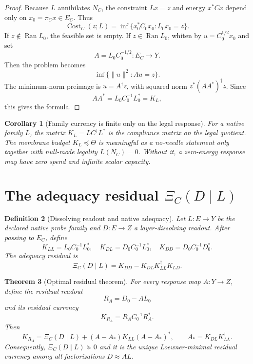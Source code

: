 \documentclass[11pt]{article}
\newtheorem{theorem}{Theorem}[section]
\newtheorem{definition}[theorem]{Definition}
\newtheorem{corollary}[theorem]{Corollary}
\DeclareMathOperator{\Ran}{Ran}
\DeclareMathOperator{\Cost}{Cost}
\begin{document}
\begin{proof}
Because \(L\) annihilates \(N_C\), the constraint \(Lx=z\) and energy \(x^*Cx\) depend only on \(x_0=\pi_Cx\in E_C\).  Thus
\[
  \Cost_C(z;L)=\inf\{x_0^*C_0x_0:L_0x_0=z\}.
\]
If \(z\notin\Ran L_0\), the feasible set is empty.  If \(z\in\Ran L_0\), whiten by \(u=C_0^{1/2}x_0\) and set
\[
  A=L_0C_0^{-1/2}:E_C\to Y.
\]
Then the problem becomes
\[
  \inf\{\|u\|^2:Au=z\}.
\]
The minimum-norm preimage is \(u=A^\dagger z\), with squared norm \(z^*(AA^*)^\dagger z\).  Since
\[
  AA^*=L_0C_0^{-1}L_0^*=K_L,
\]
this gives the formula.
\end{proof}

\begin{corollary}[Family currency is finite only on the legal response]
For a native family \(L\), the matrix \(K_L=LC^\dagger L^*\) is the compliance matrix on the legal quotient.  The membrane budget \(K_L\preceq\Theta\) is meaningful as a no-needle statement only together with null-mode legality \(L(N_C)=0\).  Without it, a zero-energy response may have zero spend and infinite scalar capacity.
\end{corollary}

\section{The adequacy residual \texorpdfstring{$\Xi_C(D\mid L)$}{Xi}}

\begin{definition}[Dissolving readout and native adequacy]
Let \(L:E\to Y\) be the declared native probe family and \(D:E\to Z\) a layer-dissolving readout.  After passing to \(E_C\), define
\[
  K_{LL}=L_0C_0^{-1}L_0^*,\quad
  K_{DL}=D_0C_0^{-1}L_0^*,\quad
  K_{DD}=D_0C_0^{-1}D_0^*.
\]
The \emph{adequacy residual} is
\[
  \boxed{\Xi_C(D\mid L)=K_{DD}-K_{DL}K_{LL}^\dagger K_{LD}.}
\]
\end{definition}

\begin{theorem}[Optimal residual theorem]
For every response map \(A:Y\to Z\), define the residual readout
\[
  R_A=D_0-AL_0
\]
and its residual currency
\[
  K_{R_A}=R_AC_0^{-1}R_A^*.
\]
Then
\[
  K_{R_A}
  =\Xi_C(D\mid L)+(A-A_*)K_{LL}(A-A_*)^*,
  \qquad
  A_*=K_{DL}K_{LL}^\dagger.
\]
Consequently, \(\Xi_C(D\mid L)\succeq0\) and it is the unique Loewner-minimal residual currency among all factorizations \(D\approx AL\).
\end{theorem}
\end{document}
